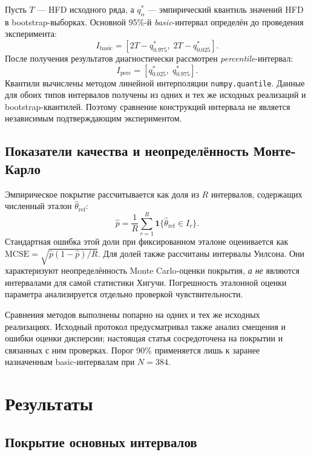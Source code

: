 Пусть $T$ --- HFD исходного ряда, а $q^*_{\alpha}$ --- эмпирический квантиль значений HFD в bootstrap-выборках. Основной 95\%-й \textit{basic}-интервал определён до проведения эксперимента:
\begin{equation}\label{eq:basic}
 I_{\mathrm{basic}}=\left[2T-q^*_{0.975},\;
 2T-q^*_{0.025}\right].
\end{equation}
После получения результатов диагностически рассмотрен \textit{percentile}-интервал:
\begin{equation}\label{eq:perc}
 I_{\mathrm{perc}}=\left[q^*_{0.025},\;q^*_{0.975}\right].
\end{equation}
Квантили вычислены методом линейной интерполяции \texttt{numpy.quantile}. Данные для обоих типов интервалов получены из одних и тех же исходных реализаций и bootstrap-квантилей. Поэтому сравнение конструкций интервала не является независимым подтверждающим экспериментом.

\subsection{Показатели качества и неопределённость Монте-Карло}

Эмпирическое покрытие рассчитывается как доля из $R$ интервалов, содержащих численный эталон $\hat\theta_{\mathrm{ref}}$:
\begin{equation}\label{eq:coverage}
 \hat p=\frac1R\sum_{r=1}^{R}
 \mathbf 1\{\hat\theta_{\mathrm{ref}}\in I_r\}.
\end{equation}
Стандартная ошибка этой доли при фиксированном эталоне оценивается как $\mathrm{MCSE}=\sqrt{\hat p(1-\hat p)/R}$. Для долей также рассчитаны интервалы Уилсона. Они характеризуют неопределённость Monte Carlo-оценки покрытия, \emph{а не} являются интервалами для самой статистики Хигучи. Погрешность эталонной оценки параметра анализируется отдельно проверкой чувствительности.

Сравнения методов выполнены попарно на одних и тех же исходных реализациях. Исходный протокол предусматривал также анализ смещения и ошибки оценки дисперсии; настоящая статья сосредоточена на покрытии и связанных с ним проверках. Порог 90\% применяется лишь к заранее назначенным basic-интервалам при $N=384$.

\section{Результаты}
\subsection{Покрытие основных интервалов}

